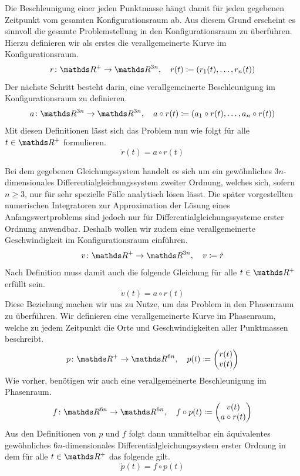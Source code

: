     Die Beschleunigung einer jeden Punktmasse hängt damit für jeden gegebenen Zeitpunkt vom gesamten Konfigurationsraum ab.
    Aus diesem Grund erscheint es sinnvoll die gesamte Problemstellung in den Konfigurationsraum zu überführen.
    Hierzu definieren wir als erstes die verallgemeinerte Kurve im Konfigurationsraum.
    \[
      \function{r}{\setReal^+}{\setReal^{3n}}
      \separate
      r(t)\define (r_1(t),\ldots,r_n(t))
    \]
    Der nächste Schritt besteht darin, eine verallgemeinerte Beschleunigung im Konfigurationsraum zu definieren.
    \[
      \function{a}{\setReal^{3n}}{\setReal^{3n}}
      \separate
      a\circ r(t) \define (a_1\circ r(t),\ldots,a_n\circ r(t))
    \]
    Mit diesen Definitionen lässt sich das Problem nun wie folgt für alle $t\in\setReal^+$ formulieren.
    \[
      \ddot{r}(t) = a\circ r(t)
    \]

    Bei dem gegebenen Gleichungssystem handelt es sich um ein gewöhnliches $3n$-dimensionales Differentialgleichungssystem zweiter Ordnung, welches sich, sofern $n\geq 3$, nur für sehr spezielle Fälle analytisch lösen lässt.
    Die später vorgestellten numerischen Integratoren zur Approximation der Lösung eines Anfangswertproblems sind jedoch nur für Differentialgleichungssysteme erster Ordnung anwendbar.
    Deshalb wollen wir zudem eine verallgemeinerte Geschwindigkeit im Konfigurationsraum einführen.
    \[
      \function{v}{\setReal^+}{\setReal^{3n}}
      \separate
      v\define \dot{r}
    \]
    Nach Definition muss damit auch die folgende Gleichung für alle $t\in\setReal^+$ erfüllt sein.
    \[
      \dot{v}(t) = a\circ r(t)
    \]
    Diese Beziehung machen wir uns zu Nutze, um das Problem in den Phasenraum zu überführen.
    Wir definieren eine verallgemeinerte Kurve im Phasenraum, welche zu jedem Zeitpunkt die Orte und Geschwindigkeiten aller Punktmassen beschreibt.
    \[
      \function{p}{\setReal^+}{\setReal^{6n}}
      \separate
      p(t) \define
      \begin{pmatrix}
        r(t) \\ v(t)
      \end{pmatrix}
    \]
    Wie vorher, benötigen wir auch eine verallgemeinerte Beschleunigung im Phasenraum.
    \[
      \function{f}{\setReal^{6n}}{\setReal^{6n}}
      \separate
      f\circ p(t)\define
      \begin{pmatrix}
        v(t) \\ a\circ r(t)
      \end{pmatrix}
    \]
    Aus den Definitionen von $p$ und $f$ folgt dann unmittelbar ein äquivalentes gewöhnliches $6n$-dimensionales Differentialgleichungssystem erster Ordnung in dem für alle $t\in\setReal^+$ das folgende gilt.
    \[
      \dot{p}(t) = f\circ p(t)
    \]

